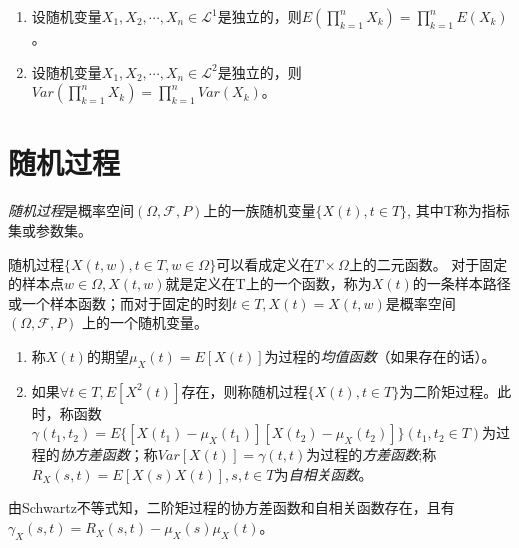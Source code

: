 \begin{theorem}[独立变量的数字特征]\label{prop:NumFeaofInd}
	\begin{enumerate}[\bfseries (1)]
		\item 设随机变量\(X_1,X_2,\cdots,X_n \in \mathcal{L}^1\)是独立的，则\(E\left(\prod_{k=1}^{n}X_k\right)=\prod_{k=1}^n E(X_k)\)。
		\item 设随机变量\(X_1,X_2,\cdots,X_n \in \mathcal{L}^2\)是独立的，则\(Var\left(\prod_{k=1}^{n}X_k\right)=\prod_{k=1}^n Var(X_k)\)。
	\end{enumerate}
\end{theorem}

\section{随机过程}

\begin{definition}\label{def:StoPro}
	\emph{随机过程}是概率空间\((\Omega,\mathscr{F},P)\)上的一族随机变量\(\{X(t),t\in T\}\),
	其中T称为指标集或参数集。
\end{definition}

随机过程\(\{X(t,w),t\in T,w\in \Omega\}\)可以看成定义在\(T\times \Omega\)上的二元函数。
对于固定的样本点\(w\in \Omega,X(t,w)\)就是定义在T上的一个函数，称为\(X(t)\)的一条样本路径
或一个样本函数；而对于固定的时刻\(t\in T,X(t)=X(t,w)\)是概率空间\((\Omega,\mathscr{F},P)\)
上的一个随机变量。

\begin{definition}\label{def:StoProNumFea}
	\begin{enumerate}[\bfseries (1)]
		\item 称\(X(t)\)的期望\(\mu_X(t)=E[X(t)]\)为过程的\emph{均值函数}（如果存在的话）。
		\item 如果\(\forall t\in T,E[X^2(t)]\)存在，则称随机过程\(\{X(t),t\in T\}\)为二阶矩过程。此时，称函数\(\gamma(t_1,t_2)=E\{[X(t_1)-\mu_X(t_1)][X(t_2)-\mu_X(t_2)]\}(t_1,t_2\in T)\)为过程的\emph{协方差函数}；称\(Var[X(t)]=\gamma(t,t)\)为过程的\emph{方差函数};称\(R_X(s,t)=E[X(s)X(t)],s,t\in T\)为\emph{自相关函数}。
	\end{enumerate}
\end{definition}

由Schwartz不等式知，二阶矩过程的协方差函数和自相关函数存在，且有\(\gamma_X(s,t)=R_X(s,t)-\mu_X(s)\mu_X(t)\)。

